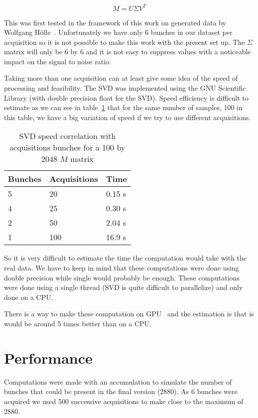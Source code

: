 $$M = U \Sigma V^{T}$$ 

This was first tested in the framework of this work on generated data by Wolfgang H{\"o}f\/le~\cite{HofleEvian10}. Unfortunately we have only 6 bunches in our dataset per acquisition so it is not possible to make this work with the present set up. The $\Sigma$ matrix will only be 6 by 6 and it is not easy to suppress values with a noticeable impact on the signal to noise ratio.

Taking more than one acquisition can at least give some idea of the speed of processing and feasibility. The SVD was implemented using the GNU Scientific Library (with double precision float for the SVD). Speed efficiency is difficult to estimate as we can see in table~\ref{tab:SVD} that for the same number of samples, 100 in this table, we have a big variation of speed if we try to use different acquisitions.

\begin{table}[H]
\caption{SVD speed correlation with acquisitions bunches for a 100 by 2048 $M$ matrix}
\label{tab:SVD}
\centering
\begin{tabular}{|l|l|l|}
\hline
Bunches & Acquisitions & Time \\
\hline
5 & 20 & 0.15 s \\
4 & 25 & 0.30 s \\
2 & 50 & 2.04 s \\
1 & 100 & 16.9 s \\
\hline
\end{tabular}
\end{table}

So it is very difficult to estimate the time the computation would take with the real data. We have to keep in mind that these computations were done using double precision while single would probably be enough. These computations were done using a single thread (SVD is quite difficult to parallelize) and only done on a \gls{CPU}.

There is a way to make these computation on \gls{GPU}~\cite{Lahabar09} and the estimation is that is would be around 5 times better than on a \gls{CPU}.

\section{Performance}
\label{sec:perf}

Computations were made with an accumulation to simulate the number of bunches that could be present in the final version (2880). As 6 bunches were acquired we used 500 successive acquisitions to make close to the maximum of 2880.

